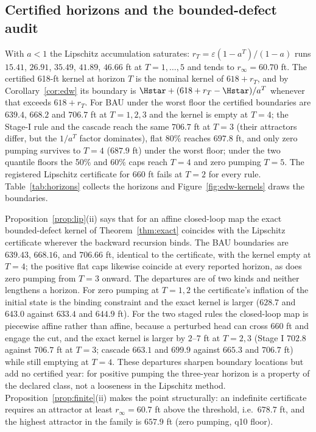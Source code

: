 \subsection{Certified horizons and the bounded-defect audit}\label{sec:edw-horizon}

With $a<1$ the Lipschitz accumulation saturates: $r_T=\varepsilon(1-a^{T})/(1-a)$ runs $15.41$, $26.91$, $35.49$, $41.89$, $46.66$ ft at $T=1,\dots,5$ and tends to $r_\infty=60.70$ ft. The certified 618-ft kernel at horizon $T$ is the nominal kernel of $618+r_T$, and by Corollary~\ref{cor:edw} its boundary is $\Hstar+(618+r_T-\Hstar)/a^{T}$ whenever that exceeds $618+r_T$. For BAU under the worst floor the certified boundaries are $639.4$, $668.2$ and $706.7$ ft at $T=1,2,3$ and the kernel is empty at $T=4$; the Stage-I rule and the cascade reach the same $706.7$ ft at $T=3$ (their attractors differ, but the $1/a^{T}$ factor dominates), flat 80\% reaches $697.8$ ft, and only zero pumping survives to $T=4$ ($687.9$ ft) under the worst floor; under the two quantile floors the 50\% and 60\% caps reach $T=4$ and zero pumping $T=5$. The registered Lipschitz certificate for 660 ft fails at $T=2$ for every rule. Table~\ref{tab:horizons} collects the horizons and Figure~\ref{fig:edw-kernels} draws the boundaries.

Proposition~\ref{prop:lip}(ii) says that for an affine closed-loop map the exact bounded-defect kernel of Theorem~\ref{thm:exact} coincides with the Lipschitz certificate wherever the backward recursion binds. The BAU boundaries are $639.43$, $668.16$, and $706.66$ ft, identical to the certificate, with the kernel empty at $T=4$; the positive flat caps likewise coincide at every reported horizon, as does zero pumping from $T=3$ onward. The departures are of two kinds and neither lengthens a horizon. For zero pumping at $T=1,2$ the certificate's inflation of the initial state is the binding constraint and the exact kernel is larger ($628.7$ and $643.0$ against $633.4$ and $644.9$ ft). For the two staged rules the closed-loop map is piecewise affine rather than affine, because a perturbed head can cross 660 ft and engage the cut, and the exact kernel is larger by $2$--$7$ ft at $T=2,3$ (Stage I $702.8$ against $706.7$ ft at $T=3$; cascade $663.1$ and $699.9$ against $665.3$ and $706.7$ ft) while still emptying at $T=4$. These departures sharpen boundary locations but add no certified year: for positive pumping the three-year horizon is a property of the declared class, not a looseness in the Lipschitz method. Proposition~\ref{prop:finite}(ii) makes the point structurally: an indefinite certificate requires an attractor at least $r_\infty=60.7$ ft above the threshold, i.e.\ $678.7$ ft, and the highest attractor in the family is $657.9$ ft (zero pumping, q10 floor).

